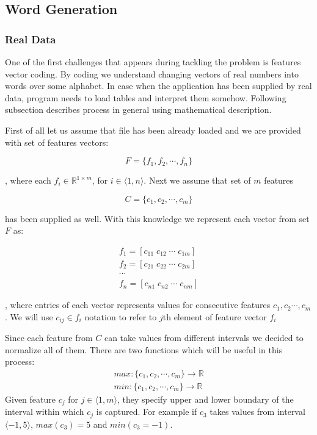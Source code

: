 \documentclass{article}
\begin{document}
\subsection{Word Generation} \label{section:word_gen}

\subsubsection{Real Data} \label{section:word_gen_real}
One of the first challenges that appears during tackling the problem is features vector coding. By coding we understand changing vectors of real numbers into words over some alphabet. In case when the application has been supplied by real data, program needs to load tables and interpret them somehow. Following subsection describes process in general using mathematical description.

First of all let us assume that file has been already loaded and we are provided with set of features vectors:

\[ F = \{ f_1 , f_2, \cdots , f_n \} \]

, where each $f_i \in \mathbb{R}^{1 \times m}$, for $i \in \langle 1,n \rangle$.
Next we assume that set of $m$ features

\[ C = \{ c_1 , c_2, \cdots , c_m \}\]

has been supplied as well. With this knowledge we represent each vector from set $F$ as:

\begin{align*}
f_1 = [ c_{11} \; c_{12} \; \cdots \; c_{1m}] \\
f_2 = [ c_{21} \; c_{22} \; \cdots \; c_{2m}] \\
\cdots \\
f_n = [ c_{n1} \; c_{n2} \; \cdots \; c_{nm}]
\end{align*}

, where entries of each vector represents values for consecutive features $c_1, c_2 \cdots , c_m$. We will use $c_{ij }\in f_i$ notation to refer to $j$th element of feature vector $f_i$

Since each feature from $C$ can take values from different intervals we decided to normalize all of them. There are two functions which will be useful in this process:
\begin{align*}
max : \{c_1, c_2, \cdots, c_m\} \rightarrow \mathbb{R} \\
min : \{c_1, c_2, \cdots, c_m\} \rightarrow \mathbb{R}
\end{align*}
Given feature $c_j$ for $j \in \langle 1, m \rangle$, they specify upper and lower boundary of the interval within which $c_j$ is captured. For example if $c_3$ takes values from interval $\langle -1 , 5 \rangle$, $max(c_3) = 5$ and $min(c_3 = -1)$.
\end{document}

